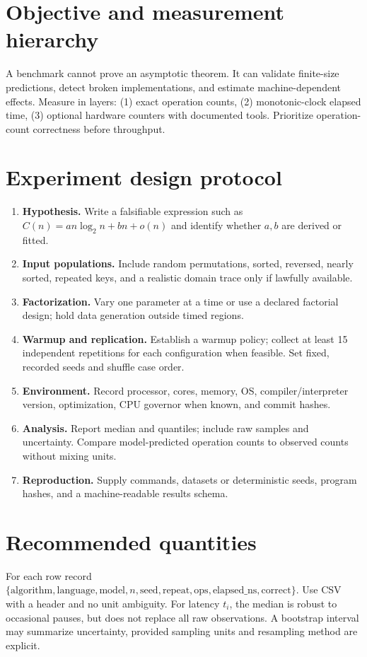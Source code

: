 \documentclass[11pt]{article}
\begin{document}
\makedoctocpage

\section{Objective and measurement hierarchy}
A benchmark cannot prove an asymptotic theorem. It can validate finite-size predictions, detect broken implementations, and estimate machine-dependent effects. Measure in layers: (1) exact operation counts, (2) monotonic-clock elapsed time, (3) optional hardware counters with documented tools. Prioritize operation-count correctness before throughput.
\section{Experiment design protocol}
\begin{enumerate}
\item \textbf{Hypothesis.} Write a falsifiable expression such as $C(n)=an\log_2 n+bn+o(n)$ and identify whether $a,b$ are derived or fitted.
\item \textbf{Input populations.} Include random permutations, sorted, reversed, nearly sorted, repeated keys, and a realistic domain trace only if lawfully available.
\item \textbf{Factorization.} Vary one parameter at a time or use a declared factorial design; hold data generation outside timed regions.
\item \textbf{Warmup and replication.} Establish a warmup policy; collect at least 15 independent repetitions for each configuration when feasible. Set fixed, recorded seeds and shuffle case order.
\item \textbf{Environment.} Record processor, cores, memory, OS, compiler/interpreter version, optimization, CPU governor when known, and commit hashes.
\item \textbf{Analysis.} Report median and quantiles; include raw samples and uncertainty. Compare model-predicted operation counts to observed counts without mixing units.
\item \textbf{Reproduction.} Supply commands, datasets or deterministic seeds, program hashes, and a machine-readable results schema.
\end{enumerate}
\section{Recommended quantities}
For each row record $\{\mathrm{algorithm},\mathrm{language},\mathrm{model},n,\mathrm{seed},\mathrm{repeat},\mathrm{ops},\mathrm{elapsed\_ns},\mathrm{correct}\}$. Use CSV with a header and no unit ambiguity. For latency $t_i$, the median is robust to occasional pauses, but does not replace all raw observations. A bootstrap interval may summarize uncertainty, provided sampling units and resampling method are explicit.
\end{document}
